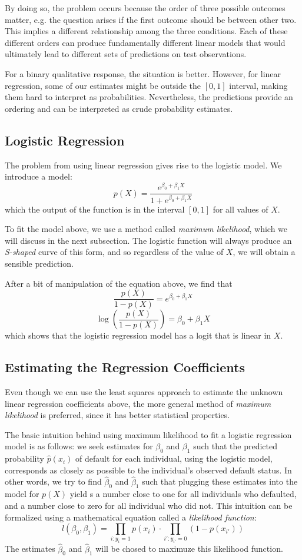\documentclass{article}
\begin{document}
By doing so, the problem occurs because the order of three possible outcomes matter, e.g. the question arises if the first outcome should be between other two. This implies a different relationship among the three conditions. Each of these different orders can produce fundamentally different linear models that would ultimately lead to different sets of predictions on test observations.

For a binary qualitative response, the situation is better. However, for linear regression, some of our estimates might be outside the $[0,1]$ interval, making them hard to interpret as probabilities. Nevertheless, the predictions provide an ordering and can be interpreted as crude probability estimates.

\subsection{Logistic Regression}
The problem from using linear regression gives rise to the logistic model. We introduce a model:
\[
	p(X) = \frac{e^{\beta_0 + \beta_1X}}{1 + e^{\beta_0 + \beta_1X}}
\]
which the output of the function is in the interval $[0,1]$ for all values of $X$.

To fit the model above, we use a method called \textit{maximum likelihood}, which we will discuss in the next subsection. The logistic function will always produce an \textit{S-shaped} curve of this form, and so regardless of the value of $X$, we will obtain a sensible prediction.

After a bit of manipulation of the equation above, we find that
\[
	\frac{p(X)}{1-p(X)} = e^{\beta_0 + \beta_1X}
\]
\[
	\log\left(\frac{p(X)}{1-p(X)}\right) = \beta_0 + \beta_1X
\]
which shows that the logistic regression model has a logit that is linear in $X$.

\subsection{Estimating the Regression Coefficients}
Even though we can use the least squares approach to estimate the unknown linear regression coefficients above, the more general method of \textit{maximum likelihood} is preferred, since it has better statistical properties.

The basic intuition behind using maximum likelihood to fit a logistic regression model is as follows: we seek estimates for $\beta_0$ and $\beta_1$ such that the predicted probability $\hat{p}(x_i)$ of default for each individual, using the logistic model, corresponds as closely as possible to the individual's observed default status. In other words, we try to find $\hat{\beta}_0$ and $\hat{\beta}_1$ such that plugging these estimates into the model for $p(X)$ yield s a number close to one for all individuals who defaulted, and a number close to zero for all individual who did not. This intuition can be formalized using a mathematical equation called a \textit{likelihood function}:
\[
	l(\beta_0,\beta_1) = \prod_{i:y_i=1}p(x_i) \cdot \prod_{i':y_{i'}=0}(1-p(x_{i'}))
\]
The estimates $\hat{\beta}_0$ and $\hat{\beta}_1$ will be chosed to maximuze this likelihood function.
\end{document}
